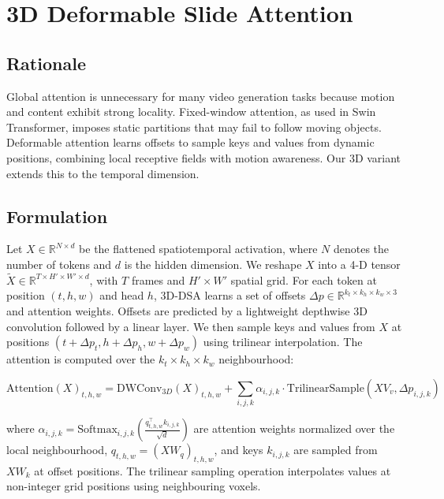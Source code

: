 \documentclass[11pt, letterpaper]{article}
\begin{document}
\section{3D Deformable Slide Attention}

\subsection{Rationale}
Global attention is unnecessary for many video generation tasks because motion and content exhibit strong locality. Fixed-window attention, as used in Swin Transformer, imposes static partitions that may fail to follow moving objects. Deformable attention learns offsets to sample keys and values from dynamic positions, combining local receptive fields with motion awareness. Our 3D variant extends this to the temporal dimension.

\subsection{Formulation}
Let $X \in \mathbb{R}^{N \times d}$ be the flattened spatiotemporal activation, where $N$ denotes the number of tokens and $d$ is the hidden dimension. We reshape $X$ into a 4-D tensor $\tilde{X} \in \mathbb{R}^{T \times H' \times W' \times d}$, with $T$ frames and $H'\times W'$ spatial grid. For each token at position $(t, h, w)$ and head $h$, 3D-DSA learns a set of offsets $\Delta p \in \mathbb{R}^{k_t \times k_h \times k_w \times 3}$ and attention weights. Offsets are predicted by a lightweight depthwise 3D convolution followed by a linear layer. We then sample keys and values from $X$ at positions $(t + \Delta p_t, h + \Delta p_h, w + \Delta p_w)$ using trilinear interpolation. The attention is computed over the $k_t \times k_h \times k_w$ neighbourhood:

\begin{equation}
\text{Attention}(X)_{t,h,w} = \text{DWConv}_{3D}(X)_{t,h,w} + \sum_{i,j,k} \alpha_{i,j,k} \cdot \text{TrilinearSample}(XV_v, \Delta p_{i,j,k})
\end{equation}

where $\alpha_{i,j,k} = \text{Softmax}_{i,j,k}\left(\frac{q_{t,h,w}^\top k_{i,j,k}}{\sqrt{d}}\right)$ are attention weights normalized over the local neighbourhood, $q_{t,h,w} = (XW_q)_{t,h,w}$, and keys $k_{i,j,k}$ are sampled from $XW_k$ at offset positions. The trilinear sampling operation interpolates values at non-integer grid positions using neighbouring voxels.
\end{document}
